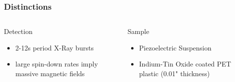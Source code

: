 \documentclass[hyperref=pdftex, presentation]{beamer}
\begin{document}

\begin{frame}{}
\frametitle{\Large Distinctions}
\begin{columns}[c] %

\begin{block}{Detection}
\begin{itemize}
 \item<2-> 2-12s period X-Ray bursts%
 \item<2-> large spin-down rates imply massive magnetic fields
\end{itemize}
\end{block}
\begin{block}{Sample}
\begin{itemize}
	\item<3-> Piezoelectric Suspension
	\item<3-> Indium-Tin Oxide coated PET plastic (0.01" thickness)
\end{itemize}
\end{block}


\end{columns}
\end{frame}







\end{document}
